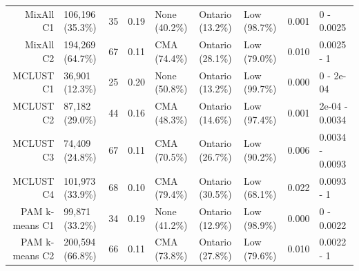 \documentclass[11pt, a4paper]{article}
\begin{document}
\begin{table}[H]
{\begin{tabular}{|r|llllllll|}
  MixAll C1 & 106,196 (35.3\%) & 35 & 0.19 & None (40.2\%) & Ontario (13.2\%) & Low (98.7\%) & 0.001 & 0 - 0.0025 \\ 
  MixAll C2 & 194,269 (64.7\%) & 67 & 0.11 & CMA (74.4\%) & Ontario (28.1\%) & Low (79.0\%) & 0.010 & 0.0025 - 1 \\ 
\rowcolor{gray!25}  MCLUST C1 & 36,901 (12.3\%) & 25 & 0.20 & None (50.8\%) & Ontario (13.2\%) & Low (99.7\%) & 0.000 & 0 - 2e-04 \\ 
\rowcolor{gray!25}  MCLUST C2 & 87,182 (29.0\%) & 44 & 0.16 & CMA (48.3\%) & Ontario (14.6\%) & Low (97.4\%) & 0.001 & 2e-04 - 0.0034 \\ 
 \rowcolor{gray!25} MCLUST C3 & 74,409 (24.8\%) & 67 & 0.11 & CMA (70.5\%) & Ontario (26.7\%) & Low (90.2\%) & 0.006 & 0.0034 - 0.0093 \\ 
 \rowcolor{gray!25} MCLUST C4 & 101,973 (33.9\%) & 68 & 0.10 & CMA (79.4\%) & Ontario (30.5\%) & Low (68.1\%) & 0.022 & 0.0093 - 1 \\ 
  PAM k-means C1 & 99,871 (33.2\%) & 34 & 0.19 & None (41.2\%) & Ontario (12.9\%) & Low (98.9\%) & 0.000 & 0 - 0.0022 \\ 
  PAM k-means C2 & 200,594 (66.8\%) & 66 & 0.11 & CMA (73.8\%) & Ontario (27.8\%) & Low (79.6\%) & 0.010 & 0.0022 - 1 \\ 
   \hline
\end{tabular}
}
\end{table}
\end{document}

